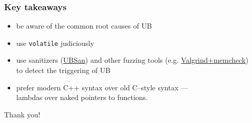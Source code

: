 \documentclass[aspectratio=169]{beamer}
\begin{document}
\begin{frame}
\frametitle{Key takeaways}
{\centering
\begin{itemize}
  \item be aware of the common root causes of UB
  \item use \texttt{volatile} judiciously
  \item use sanitizers (\href{https://clang.llvm.org/docs/UndefinedBehaviorSanitizer.html}{UBSan})
  and other fuzzing tools (e.g. \href{https://heeris.id.au/2016/valgrind-gdb/}{Valgrind+memcheck})\\
  to detect the triggering of UB
  \item prefer modern C++ syntax over old C--style syntax ---\\
  lambdas over naked pointers to functions.
\end{itemize}

\vspace{2ex}
\begin{center}{\Large Thank you!}\end{center}
}
\end{frame}
\end{document}
